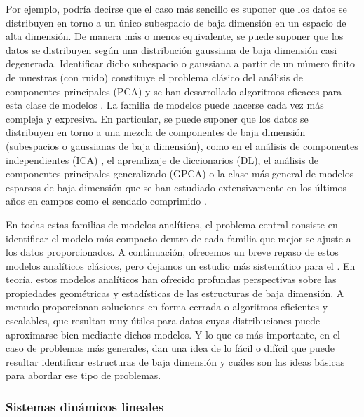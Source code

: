 \documentclass[../../book-main_es.tex]{subfiles}
\begin{document}
Por ejemplo, podría decirse que el caso más sencillo es suponer que los datos se
distribuyen en torno a un único subespacio de baja dimensión en un
espacio de alta dimensión. De manera más o menos equivalente, se puede suponer que
los datos se distribuyen según una distribución gaussiana de baja dimensión
casi degenerada. Identificar dicho subespacio o gaussiana
a partir de un número finito de muestras (con ruido) constituye el problema clásico del
análisis de componentes principales (PCA) y se han desarrollado algoritmos eficaces
para esta clase de modelos \cite{JolliffeI2002}. La familia de modelos puede hacerse 
cada vez más compleja y expresiva.
En particular, se puede suponer que los datos se distribuyen en torno a una
mezcla de componentes de baja dimensión (subespacios o gaussianas de baja dimensión),
como en el análisis de componentes independientes (ICA)
\cite{Ans-1985}, el aprendizaje de diccionarios (DL), el análisis de componentes principales
generalizado (GPCA) \cite{Vidal-GPCA} o la clase más general
de modelos esparsos de baja dimensión que se han estudiado
extensivamente en los últimos años en campos como el sendado comprimido
\cite{Wright-Ma-2022}.

En todas estas familias de modelos analíticos, el problema central consiste en
identificar el modelo más compacto dentro de cada familia que mejor se ajuste a los
datos proporcionados. A continuación, ofrecemos un breve repaso de estos modelos 
analíticos clásicos, pero dejamos un estudio más sistemático para el 
. En teoría, estos modelos analíticos han ofrecido
profundas perspectivas sobre las propiedades geométricas y estadísticas de
las estructuras de baja dimensión. A menudo proporcionan soluciones en forma cerrada o
algoritmos eficientes y escalables, que resultan muy útiles para datos
cuyas distribuciones puede aproximarse bien mediante dichos modelos. Y lo que es más
importante, en el caso de problemas más generales, dan una idea de lo
fácil o difícil que puede resultar identificar estructuras de baja dimensión
y cuáles son las ideas básicas para abordar ese tipo de problemas.

\subsubsection{Sistemas dinámicos lineales} \label{sec:linear-systems}

\vspace{2mm}
\end{document}
